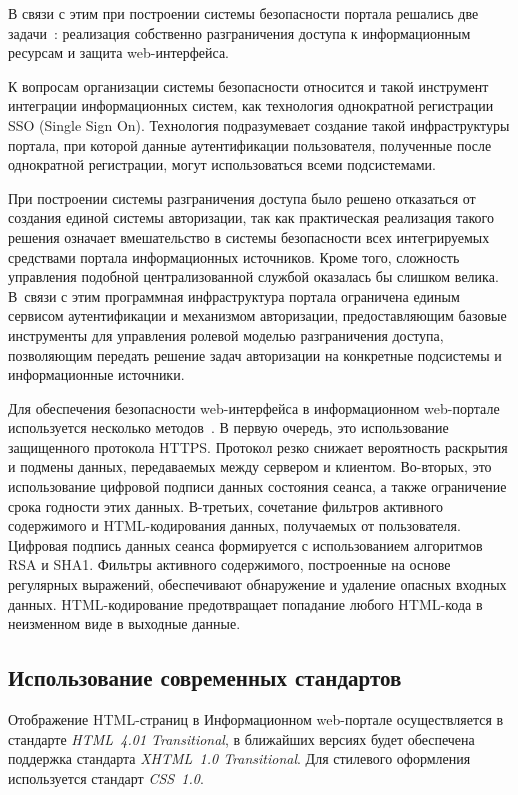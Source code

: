 \begin{multicols}{2}
 В связи с этим при построении системы безопасности портала решались две
задачи~\cite{11bos}: реализация собственно разграничения доступа к информационным
ресурсам и защита web-интерфейса.

 К вопросам организации системы безопасности относится и такой инструмент
интеграции информационных систем, как технология однократной регистрации SSO
(Single Sign On). Технология подразумевает создание такой инфраструктуры портала, при
которой данные аутентификации пользователя, полученные после однократной
регистрации, могут использоваться всеми подсистемами.

 При построении системы разграничения до\-сту\-па было решено отказаться от
создания единой сис\-те\-мы авторизации, так как практическая реа\-ли\-зация
такого решения означает вмешательство в сис\-те\-мы безопасности всех
интегрируемых средствами портала информационных источников. Кроме того, сложность
управления подобной централизованной службой оказалась бы слишком ве\-ли\-ка.
В~свя\-зи с этим программная ин\-фра\-струк\-тура портала ограничена единым
сервисом аутентификации и механизмом авторизации, предо\-став\-ля\-ющим базовые
инструменты для управления ролевой моделью разграничения доступа, позволяющим
передать решение задач авторизации на конкретные подсистемы и информационные
источники.

 Для обеспечения безопасности web-интерфейса в информационном web-портале
используется несколь\-ко методов~\cite{11bos}. В первую очередь, это использование
защищенного протокола HTTPS. Протокол резко снижает вероятность раскрытия и
подмены данных, передаваемых между сервером и клиентом.
Во-вторых, это
использование циф\-ро\-вой подписи данных состояния сеанса, а также ограничение срока
годности этих данных. В-треть\-их, сочетание фильтров активного содержимого и
 HTML-кодирования данных, получаемых от пользователя. Цифровая подпись
данных сеанса формируется с использованием алгоритмов RSA и SHA1. Фильтры
активного содержимого, построенные на основе регулярных выражений, обеспечивают
обнаружение и удаление опасных входных данных. HTML-кодирование предотвращает
попадание любого HTML-кода в неизменном виде в выходные данные.

\subsection{Использование современных стандартов} %

 Отображение HTML-страниц в Информационном web-портале осуществляется в
стандарте \textit{HTML~4.01 Transitional}, в ближайших версиях будет обеспечена
поддержка стандарта \textit{XHTML~1.0 Transitional}. Для стилевого оформления
используется стандарт \textit{CSS~1.0}.


\end{multicols}
